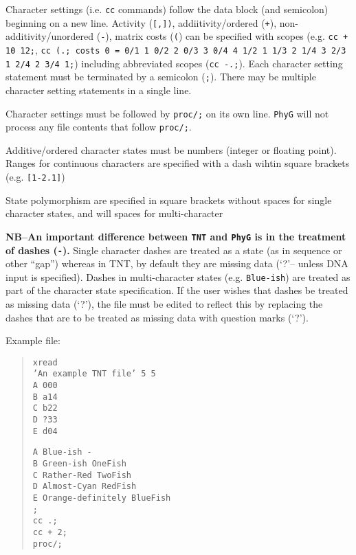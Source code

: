 \documentclass[11pt]{article}
\begin{document}
			Character settings (i.e. \texttt{cc} commands) follow the data block (and semicolon)
		    beginning on a new line.  Activity (\texttt{[,])}, addiitivity/ordered (\texttt{+}), non-additivity/unordered
		    (\texttt{-}), matrix costs (\texttt{(}) can be specified with scopes (e.g. \texttt{cc + 10 12;}, \texttt{cc (.;
		    costs 0 = 0/1 1 0/2 2 0/3 3 0/4 4 1/2 1 1/3 2 1/4 3 2/3 1 2/4 2 3/4 1;}) including abbreviated scopes (\texttt{cc -.;}). Each character setting statement must be terminated by a semicolon (\texttt{;}).  There may
	        be multiple character setting statements in a single line. 
		    
		    Character settings must be followed by \texttt{proc/;} on its own line. \texttt{PhyG} will not process
		    any file contents that follow  \texttt{proc/;}.
		    
		    Additive/ordered character states must be numbers (integer or floating point).  Ranges for continuous
		    characters are specified with a dash wihtin square brackets (e.g. \texttt{[1-2.1]})
		    
		    State polymorphism are specified in square brackets without spaces for
		    single character states, and will spaces for multi-character
		    
		    \textbf{NB--An important difference between \texttt{TNT} and \texttt{PhyG} is in the 
		    treatment of dashes (\texttt{-}).}  Single character dashes are treated as a state (as in sequence or other 
		    ``gap'') whereas in TNT, by default they are missing data (`?'-- unless DNA input is specified).  Dashes in multi-character states (e.g. \texttt{Blue-ish}) are treated as part of the character state specification.
		    If the user wishes that dashes be treated as missing data (`?'), the file must be edited to reflect this
		    by replacing the dashes that are to be treated as missing data with question marks (`?').
		    
		    Example file:
		    	\begin{quote}
		    	\texttt{xread\\
		    	'An example TNT file' 5 5\\
		    	A 000\\
		    	B a14\\
		    	C b22\\
		    	D ?33\\
		    	E d04\\}
		    	
		    	\texttt{A Blue-ish -\\
		    	B Green-ish OneFish\\
		    	C Rather-Red TwoFish\\
		    	D Almost-Cyan RedFish\\
		    	E Orange-definitely BlueFish\\
		    	;\\
		    	cc .;\\
		    	cc + 2;\\
		    	proc/;\\}
		    \end{quote}
			
\end{document}

